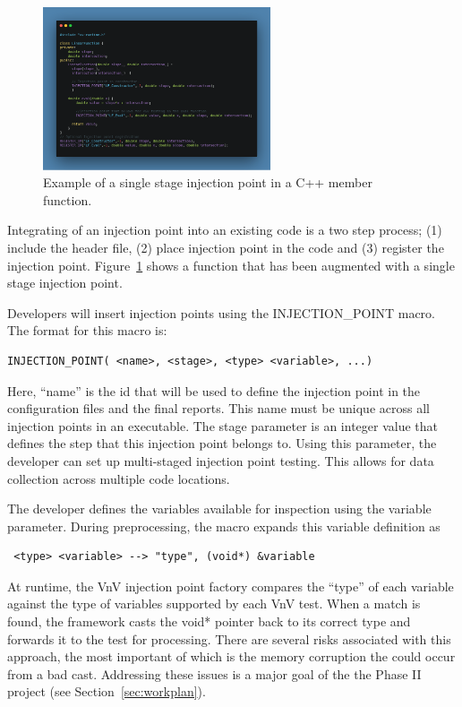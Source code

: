 \begin{figure}
 \centering
 \includegraphics[width=0.6\textwidth]{./narrative/figures/code-example.png}
 \caption{Example of a single stage injection point in a C++ member function. \label{fig:example}}
\end{figure}

Integrating of an injection point into an existing code is a two step process; (1) include the header file, (2) place injection point in the code and (3) register the injection point. Figure~\ref{fig:example} shows a function that has been augmented with a single stage injection point. 

Developers will insert injection points using the INJECTION\_POINT macro. The format for this macro is:

\begin{verbatim} 
INJECTION_POINT( <name>, <stage>, <type> <variable>, ...)
\end{verbatim}

Here, ``name'' is the id that will be used to define the injection point in the configuration files and the final reports. This name must be unique across all injection points in an executable. The stage parameter is an integer value that defines the step that this injection point belongs to. Using this parameter, the developer can set up multi-staged injection point testing. This allows for data collection across multiple code locations. 

The developer defines the variables available for inspection using the variable parameter. During preprocessing, the macro expands this variable definition as 
\begin{verbatim}
 <type> <variable> --> "type", (void*) &variable 
\end{verbatim}

At runtime, the VnV injection point factory compares the ``type'' of each variable against the type of variables supported by each 
VnV test. When a match is found, the framework casts the void* pointer back to its correct type and forwards it to the test for processing. There are several risks associated with this approach, the most important of which is the memory corruption the could occur from a bad cast. Addressing these issues is a major goal of the the Phase II project (see Section~\ref{sec:workplan}).

